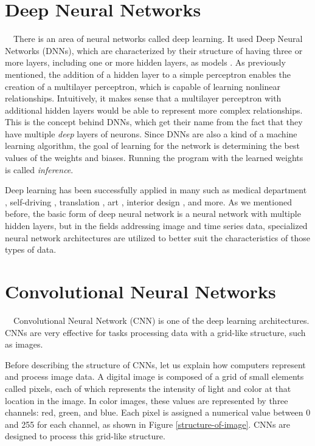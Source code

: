 \section{Deep Neural Networks}
　There is an area of neural networks called deep learning. 
It used Deep Neural Networks (DNNs), which are characterized by their structure
of having three or more layers, including one or more hidden layers, as models \cite{8114708}.
As previously mentioned, the addition of a hidden layer to a simple perceptron 
enables the creation of a multilayer perceptron, which is capable of learning 
nonlinear relationships. 
Intuitively, it makes sense that a multilayer perceptron with additional 
hidden layers would be able to represent more complex relationships.
This is the concept behind DNNs, which get their name from the fact that they 
have multiple \textit{deep} layers of neurons.
Since DNNs are also a kind of a machine learning algorithm, the goal of learning
for the network is determining the best values of the weights and biases. 
Running the program with the learned weights is called \textit{inference}.

Deep learning has been successfully applied in many such as medical department \cite{medical}, 
self-driving \cite{do2018real}, translation \cite{translation}, art \cite{zou2020stylized},
interior design \cite{interior}, and more.
As we mentioned before, the basic form of deep neural network is a neural network with 
multiple hidden layers, but in the fields addressing image and time series data,
specialized neural network architectures are utilized to better suit the 
characteristics of those types of data.

\section{Convolutional Neural Networks}
　Convolutional Neural Network (CNN) is one of the deep learning architectures. 
CNNs are very effective for tasks processing data with a grid-like structure, 
such as images.

Before describing the structure of CNNs, let us explain how computers represent 
and process image data. A digital image is composed of a grid of small elements 
called pixels, each of which represents the intensity of light and color at 
that location in the image.
In color images, these values are represented by three channels: 
red, green, and blue. Each pixel is assigned a numerical value 
between 0 and 255 for each channel, as shown in Figure \ref{structure-of-image}.
CNNs are designed to process this grid-like structure.

